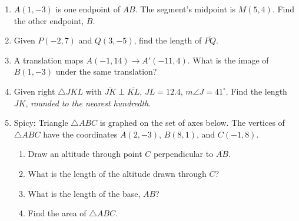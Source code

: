 \documentclass[12pt, twoside]{article}
\begin{document}
\begin{enumerate}
  \newpage

    \item $A(1,-3)$ is one endpoint of $\overline{AB}$. The segment's midpoint is $M(5,4)$. Find the other endpoint, $B$. \vspace{3cm}

    \item Given $P(-2,7)$ and $Q(3,-5)$, find the length of $\overline{PQ}$.
        \vspace{4cm}

    \item A translation maps $A(-1,14) \rightarrow A'(-11,4)$. What is the image of $B(1,-3)$ under the same translation?  \vspace{3cm}


  \item Given right $\triangle JKL$ with $\overline{JK} \perp \overline{KL}$, $JL=12.4$, $m\angle J=41^\circ$. Find the length $JK$, \emph{rounded to the nearest hundredth}.
    \begin{center}
    \end{center}


\newpage


  \item Spicy: Triangle $\triangle ABC$ is graphed on the set of axes below. The vertices of $\triangle ABC$ have the coordinates $A(2,-3)$, $B(8,1)$, and $C(-1,8)$.
    \begin{center} %
    \end{center}
    \begin{enumerate}
      \item Draw an altitude through point $C$ perpendicular to $\overline{AB}$.
      \item What is the length of the altitude drawn through $C$? \vspace{3.5cm}
      \item What is the length of the base, $AB$?  \vspace{3.5cm}
      \item Find the area of  $\triangle ABC$.
    \end{enumerate}


  \end{enumerate}

  
\end{document}
